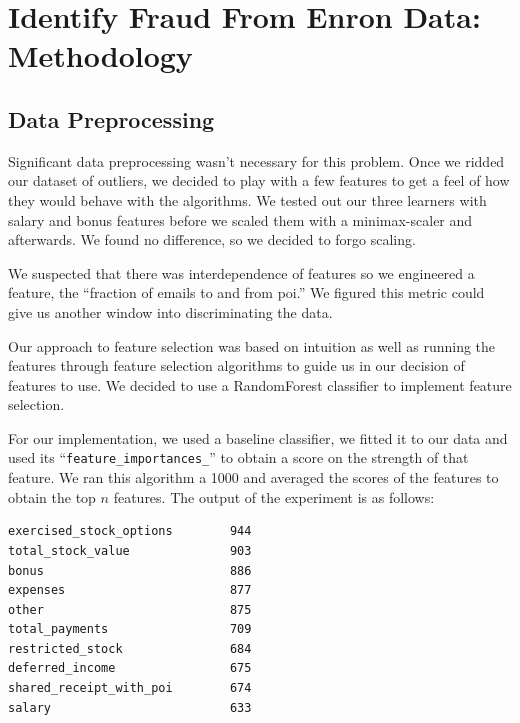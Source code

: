 \documentclass[twoside,openright,titlepage,numbers=noenddot,headinclude,%
               footinclude=true,cleardoublepage=empty,abstractoff,BCOR=5mm,%
               paper=a4,fontsize=11pt,ngerman,american]{scrreprt}
\numberwithin{theorem}{chapter}
\numberwithin{definition}{chapter}
\numberwithin{algorithm}{chapter}
\numberwithin{figure}{chapter}
\numberwithin{table}{chapter}
\numberwithin{equation}{chapter}
\begin{document}
\chapter*{Identify Fraud From Enron Data: Methodology}

\section*{Data Preprocessing}
Significant data preprocessing wasn't necessary for this problem. Once we ridded our dataset of outliers, we decided to play with a few features to get a feel of how they would behave with the algorithms. We tested out our three learners with salary and bonus features before we scaled them with a minimax-scaler and afterwards. We found no difference, so we decided to forgo scaling.

We suspected that there was interdependence of features so we engineered a feature, the ``fraction of emails to and from poi.'' We figured this metric could give us another window into discriminating the data. 

Our approach to feature selection was based on intuition as well as running the features through feature selection algorithms to guide us in our decision of features to use. We decided to use a RandomForest classifier to implement feature selection.

For our implementation, we used a baseline classifier, we fitted it to our data and used its ``\texttt{feature\_importances\_}'' to obtain a score on the strength of that feature. We ran this algorithm a 1000 and averaged the scores of the features to obtain the top $n$ features. The output of the experiment is as follows:
\begin{verbatim}
exercised_stock_options        944
total_stock_value              903
bonus                          886
expenses                       877
other                          875
total_payments                 709
restricted_stock               684
deferred_income                675
shared_receipt_with_poi        674
salary                         633
\end{verbatim}
\end{document}
